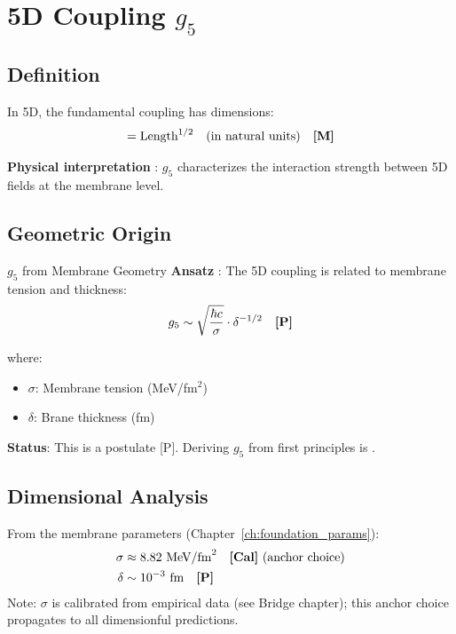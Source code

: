 \section{5D Coupling $g_5$}
\label{sec:g5}

\subsection{Definition}

In 5D, the fundamental coupling has dimensions:
\begin{equation}
[g_5] = \text{Length}^{1/2} \quad \text{(in natural units)} \quad \tagM
\end{equation}

\textbf{Physical interpretation} \tagP{}: $g_5$ characterizes the interaction
strength between 5D fields at the membrane level.

\subsection{Geometric Origin}

\begin{mechanism}{$g_5$ from Membrane Geometry}
\textbf{Ansatz} \tagP{}:
The 5D coupling is related to membrane tension and thickness:
\begin{equation}
g_5 \sim \sqrt{\frac{\hbar c}{\sigma}} \cdot \delta^{-1/2} \quad \textbf{[P]}
\end{equation}

where:
\begin{itemize}[nosep]
\item $\sigma$: Membrane tension (MeV/fm$^2$)
\item $\delta$: Brane thickness (fm)
\end{itemize}

\textbf{Status}: This is a postulate [P]. Deriving $g_5$ from first
principles is .
\end{mechanism}

\subsection{Dimensional Analysis}

From the membrane parameters (Chapter~\ref{ch:foundation_params}):
\begin{align}
\sigma &\approx 8.82 \text{ MeV/fm}^2 \quad \textbf{[Cal]}{} \text{ (anchor choice)} \\
\delta &\sim 10^{-3} \text{ fm} \quad \textbf{[P]}
\end{align}
Note: $\sigma$ is calibrated from empirical data (see Bridge chapter); this
anchor choice propagates to all dimensionful predictions.


